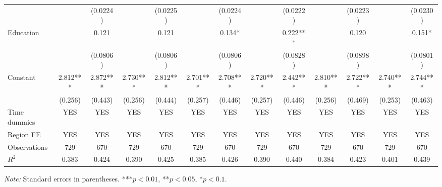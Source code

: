 \documentclass[12pt]{article}
\begin{document}
\begin{landscape}
\begin{table}[H]
\begin{threeparttable}
{\begin{tabular}{@{}lcccccccccccc@{}}
 & & (0.0224) & & (0.0225) & & (0.0224) & & (0.0222) & & (0.0223) & & (0.0230) \\[2pt]
Education & & 0.121 & & 0.121 & & 0.134* & & 0.222*** & & 0.120 & & 0.151* \\
 & & (0.0806) & & (0.0806) & & (0.0806) & & (0.0828) & & (0.0898) & & (0.0801) \\[2pt]
Constant & 2.812*** & 2.872*** & 2.730*** & 2.812*** & 2.701*** & 2.708*** & 2.720*** & 2.442*** & 2.810*** & 2.722*** & 2.740*** & 2.744*** \\
 & (0.256) & (0.443) & (0.256) & (0.444) & (0.257) & (0.446) & (0.257) & (0.446) & (0.256) & (0.469) & (0.253) & (0.463) \\[4pt]
Time dummies & YES & YES & YES & YES & YES & YES & YES & YES & YES & YES & YES & YES \\
Region FE & YES & YES & YES & YES & YES & YES & YES & YES & YES & YES & YES & YES \\
Observations & 729 & 670 & 729 & 670 & 729 & 670 & 729 & 670 & 729 & 670 & 729 & 670 \\
$R^2$ & 0.383 & 0.424 & 0.390 & 0.425 & 0.385 & 0.426 & 0.390 & 0.440 & 0.384 & 0.423 & 0.401 & 0.439 \\
\bottomrule
\end{tabular}
}
\begin{tablenotes}
\small
\item \textit{Note:} Standard errors in parentheses. ***$p<0.01$, **$p<0.05$, *$p<0.1$.
\end{tablenotes}
\end{threeparttable}
\end{table}
\end{landscape}
\end{document}
